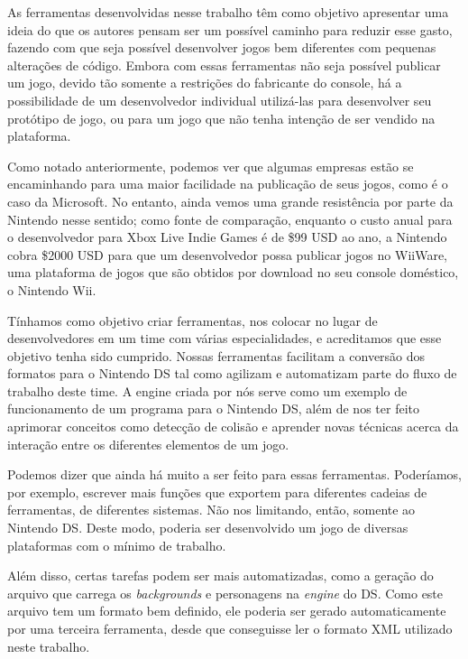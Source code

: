 \documentclass[brazil]{abnt}
\begin{document}
As ferramentas desenvolvidas nesse trabalho têm como objetivo apresentar uma ideia do que os autores pensam ser um possível caminho para reduzir esse gasto, fazendo com que seja possível desenvolver jogos bem diferentes com pequenas alterações de código. Embora com essas ferramentas não seja possível publicar um jogo, devido tão somente a restrições do fabricante do console, há a possibilidade de um desenvolvedor individual utilizá-las para desenvolver seu protótipo de jogo, ou para um jogo que não tenha intenção de ser vendido na plataforma.

Como notado anteriormente, podemos ver que algumas empresas estão se encaminhando para uma maior facilidade na publicação de seus jogos, como é o caso da Microsoft. No entanto, ainda vemos uma grande resistência por parte da Nintendo nesse sentido; como fonte de comparação, enquanto o custo anual para o desenvolvedor para Xbox Live Indie Games é de \$99 USD ao ano, a Nintendo cobra \$2000 USD para que um desenvolvedor possa publicar jogos no WiiWare, uma plataforma de jogos que são obtidos por download no seu console doméstico, o Nintendo Wii. \cite{WiiWare}

Tínhamos como objetivo criar ferramentas, nos colocar no lugar de desenvolvedores em um time com várias especialidades, e acreditamos que esse objetivo tenha sido cumprido. Nossas ferramentas facilitam a conversão dos formatos para o Nintendo DS tal como agilizam e automatizam parte do fluxo de trabalho deste time. A engine criada por nós serve como um exemplo de funcionamento de um programa para o Nintendo DS, além de nos ter feito aprimorar conceitos como detecção de colisão e aprender novas técnicas acerca da interação entre os diferentes elementos de um jogo.

Podemos dizer que ainda há muito a ser feito para essas ferramentas. Poderíamos, por exemplo, escrever mais funções que exportem para diferentes cadeias de ferramentas, de diferentes sistemas. Não nos limitando, então, somente ao Nintendo DS. Deste modo, poderia ser desenvolvido um jogo de diversas plataformas com o mínimo de trabalho.

Além disso, certas tarefas podem ser mais automatizadas, como a geração do arquivo que carrega os \textit{backgrounds} e personagens na \textit{engine} do DS. Como este arquivo tem um formato bem definido, ele poderia ser gerado automaticamente por uma terceira ferramenta, desde que conseguisse ler o formato XML utilizado neste trabalho.

\end{document}
